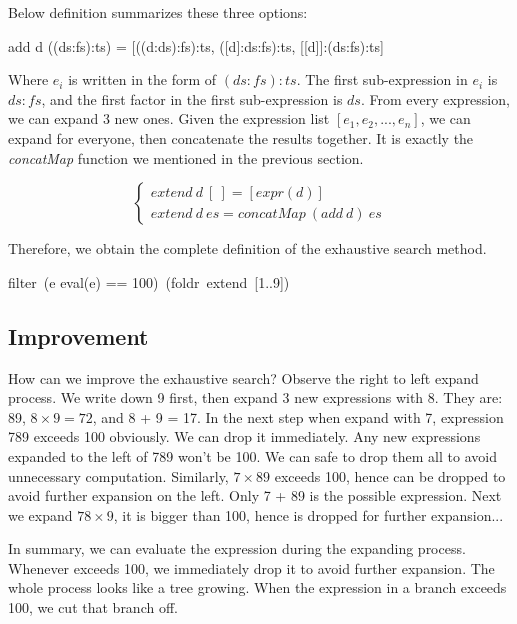 \documentclass[b5paper]{article}
\begin{document}
Below definition summarizes these three options:

\begin{Haskell}
add d ((ds:fs):ts) = [((d:ds):fs):ts,
                      ([d]:ds:fs):ts,
                      [[d]]:(ds:fs):ts]
\end{Haskell}

Where $e_i$ is written in the form of $(ds:fs):ts$. The first sub-expression in $e_i$ is $ds:fs$, and the first factor in the first sub-expression is $ds$. From every expression, we can expand 3 new ones. Given the expression list $[e_1, e_2, ..., e_n]$, we can expand for everyone, then concatenate the results together. It is exactly the \textit{concatMap} function we mentioned in the previous section.

\[
\begin{cases}
extend\ d\ [\ ] = [expr(d)] \\
extend\ d\ es = \textit{concatMap}\ (add\ d)\ es
\end{cases}
\]

Therefore, we obtain the complete definition of the exhaustive search method.

\be
filter\ (e \mapsto eval(e) == 100)\ (foldr\ extend\ [1..9])
\label{eq:puzzle100-basic}
\ee

\subsection{Improvement}

How can we improve the exhaustive search? Observe the right to left expand process. We write down 9 first, then expand 3 new expressions with 8. They are: 89, $8 \times 9 = 72$, and 8 + 9 = 17. In the next step when expand with 7, expression 789 exceeds 100 obviously. We can drop it immediately. Any new expressions expanded to the left of 789 won't be 100. We can safe to drop them all to avoid unnecessary computation. Similarly, $7 \times 89$ exceeds 100, hence can be dropped to avoid further expansion on the left. Only 7 + 89 is the possible expression. Next we expand $78 \times 9$, it is bigger than 100, hence is dropped for further expansion...

In summary, we can evaluate the expression during the expanding process. Whenever exceeds 100, we immediately drop it to avoid further expansion. The whole process looks like a tree growing. When the expression in a branch exceeds 100, we cut that branch off.
\end{document}
